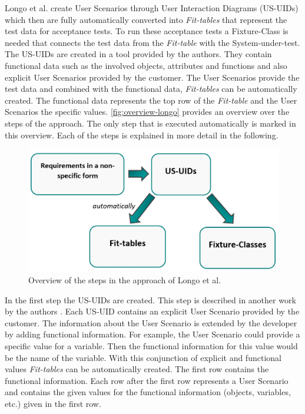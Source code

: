 Longo et al. \cite{longo} create User Scenarios through User Interaction Diagrams (US-UIDs) which then are fully automatically converted into \textit{Fit-tables} that represent the test data for acceptance tests.
To run these acceptance tests a Fixture-Class is needed that connects the test data from the \textit{Fit-table} with the System-under-test.
The US-UIDs are created in a tool provided by the authors.
They contain functional data such as the involved objects, attributes and functions and also explicit User Scenarios provided by the customer.
The User Scenarios provide the test data and combined with the functional data, \textit{Fit-tables} can be automatically created.
The functional data represents the top row of the \textit{Fit-table} and the User Scenarios the specific values.
\autoref{fig:overview-longo} provides an overview over the steps of the approach.
The only step that is executed automatically is marked in this overview.
Each of the steps is explained in more detail in the following.

\begin{figure}[H]
	\centering
	\includegraphics[width=.7\textwidth]{../images/LongoProcess.png}
	\caption{Overview of the steps in the approach of Longo et al.}
	\label{fig:overview-longo}
\end{figure}
\newpage
In the first step the US-UIDs are created.
This step is described in another work by the authors \cite{longo2}.
Each US-UID contains an explicit User Scenario provided by the customer.
The information about the User Scenario is extended by the developer by adding functional information.
For example, the User Scenario could provide a specific value for a variable.
Then the functional information for this value would be the name of the variable.
With this conjunction of explicit and functional values \textit{Fit-tables} can be automatically created.
The first row contains the functional information.
Each row after the first row represents a User Scenario and contains the given values for the functional information (objects, variables, etc.) given in the first row.

